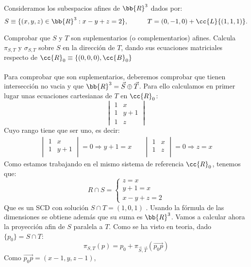 \documentclass[12pt]{article}
\begin{document}
    \begin{ejercicio}[2,5 puntos]
        Consideramos los subespacios afines de $\bb{R}^3$ dados por:
        \begin{gather*}
            S \equiv \{(x,y,z) \in \bb{R}^3 : x-y+z=2\}, \hspace*{1cm} T=(0,-1,0)+\cc{L}\{(1,1,1)\}.
        \end{gather*}

        Comprobar que $S$ y $T$ son suplementarios (o complementarios) afines. Calcula $\pi_{S,T}$ y $\sigma_{S,T}$ sobre $S$ en la dirección de $T$, dando sus ecuaciones matriciales respecto de $\cc{R}_0\equiv\{(0,0,0), \cc{B}_0\}$
        \\ \\
        Para comprobar que son suplementarios, deberemos comprobar que tienen intersección no vacia y que $\bb{R}^3 = \vec{S} \oplus \vec{T}$. Para ello calculamos en primer lugar unas ecuaciones cartesianas de $T$ en $\cc{R}_0$:
        \begin{equation*}
            \begin{vmatrix}
                1 & x \\ 
                1 & y + 1 \\
                1 & z
            \end{vmatrix}
        \end{equation*}
        Cuyo rango tiene que ser uno, es decir:
        \begin{align*}
            \begin{vmatrix}
                1 & x \\ 
                1 & y + 1 \\
            \end{vmatrix} = 0 \Rightarrow y + 1 = x
            \quad &
            \begin{vmatrix}
                1 & x \\ 
                1 & z \\
            \end{vmatrix} = 0 \Rightarrow z = x
        \end{align*}
        Como estamos trabajando en el mismo sistema de referencia $\cc{R}_0$, tenemos que:
        \begin{equation*}
            R \cap S = \begin{cases}
                z = x \\ 
                y + 1 = x \\
                x - y + z = 2
            \end{cases}
        \end{equation*}
        Que es un SCD con solución $S \cap T =(1,0,1)$ . Usando la fórmula de las dimensiones se obtiene además que 
        su suma es $\bb{R}^3$. Vamos a calcular ahora la proyección afin de $S$ paralela a $T$. Como se ha visto en teoria, dado $\{p_0\} = S \cap T$:
        \begin{equation*}
            \pi_{S,T} (p) = p_0 + \pi_{\vec{S},\vec{T}}(\vec{p_0 p})
        \end{equation*}
        Como $\vec{p_0p} = (x -1, y, z - 1)$, %
    \end{ejercicio}
\end{document}
